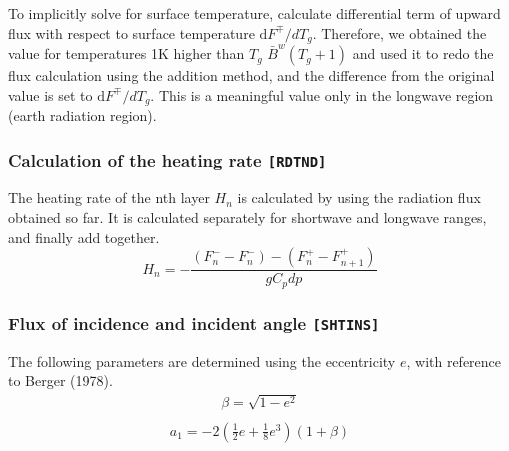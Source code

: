 To implicitly solve for surface temperature, calculate differential term
of upward flux with respect to surface temperature
\(\mathrm{d}F^{\mp}/dT_{g}\). Therefore, we obtained the value for
temperatures 1K higher than \(T_g\) \(\bar{B}^{w}\left(T_{g}+1\right)\)
and used it to redo the flux calculation using the addition method, and
the difference from the original value is set to
\(\mathrm{d}F^{\mp}/dT_{g}\). This is a meaningful value only in the
longwave region (earth radiation region).

\hypertarget{calculation-of-the-heating-rate-rdtnd}{%
\subsubsection{\texorpdfstring{Calculation of the heating rate
\texttt{{[}RDTND{]}}}{Calculation of the heating rate {[}RDTND{]}}}\label{calculation-of-the-heating-rate-rdtnd}}

The heating rate of the nth layer \(H_n\) is calculated by using the
radiation flux obtained so far. It is calculated separately for
shortwave and longwave ranges, and finally add together. \begin{equation}
H_{n}=-\frac{\left(F_{n}^{-}-F_{n}^{-}\right)-\left(F_{n}^{+}-F_{n+1}^{+}\right)}{g C_{p} d p}
\end{equation}

\hypertarget{flux-of-incidence-and-incident-angle-shtins}{%
\subsubsection{\texorpdfstring{Flux of incidence and incident angle
\texttt{{[}SHTINS{]}}}{Flux of incidence and incident angle {[}SHTINS{]}}}\label{flux-of-incidence-and-incident-angle-shtins}}

The following parameters are determined using the eccentricity \(e\),
with reference to Berger (1978). \begin{equation}
\begin{array}{l}
\beta=\sqrt{1-e^{2}} \\
\end{array}
\end{equation} \begin{equation}
\begin{array}{l}
a_{1}=-2\left(\frac{1}{2} e+\frac{1}{8} e^{3}\right)(1+\beta) \\
\end{array}
\end{equation}

